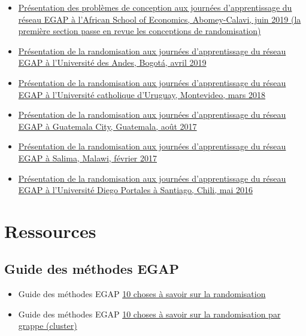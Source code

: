 \documentclass[
  12pt,
]{book}
\begin{document}
\begin{itemize}
\item
  \href{https://egap.github.io/learningdays-resources/Slides/Examples/threats-benin.pdf}{Présentation des problèmes de conception aux journées d'apprentissage du réseau EGAP à l'African School of Economics, Abomey-Calavi, juin 2019 (la première section passe en revue les conceptions de randomisation)}
\item
  \href{https://egap.github.io/learningdays-resources/Slides/Examples/randomization-bogota.pdf}{Présentation de la randomisation aux journées d'apprentissage du réseau EGAP à l'Université des Andes, Bogotá, avril 2019}
\item
  \href{https://egap.github.io/learningdays-resources/Slides/Examples/randomization-montevideo.pdf}{Présentation de la randomisation aux journées d'apprentissage du réseau EGAP à l'Université catholique d'Uruguay, Montevideo, mars 2018}
\item
  \href{https://egap.github.io/learningdays-resources/Slides/Examples/randomization-guatemala.pdf}{Présentation de la randomisation aux journées d'apprentissage du réseau EGAP à Guatemala City, Guatemala, août 2017}
\item
  \href{https://egap.github.io/learningdays-resources/Slides/Examples/randomization-malawi.pdf}{Présentation de la randomisation aux journées d'apprentissage du réseau EGAP à Salima, Malawi, février 2017}
\item
  \href{https://egap.github.io/learningdays-resources/Slides/Examples/randomization-santiago.pdf}{Présentation de la randomisation aux journées d'apprentissage du réseau EGAP à l'Université Diego Portales à Santiago, Chili, mai 2016}
\end{itemize}

\hypertarget{ressources-2}{%
\section{Ressources}\label{ressources-2}}

\hypertarget{guide-des-muxe9thodes-egap-2}{%
\subsection{Guide des méthodes EGAP}\label{guide-des-muxe9thodes-egap-2}}

\begin{itemize}
\item
  Guide des méthodes EGAP \href{https://egap.org/resource/10-things-to-know-about-randomization/}{10 choses à savoir sur la randomisation}
\item
  Guide des méthodes EGAP \href{https://egap.org/resource/10-things-to-know-about-cluster-randomization/}{10 choses à savoir sur la randomisation par grappe (cluster)}
\end{itemize}
\end{document}
